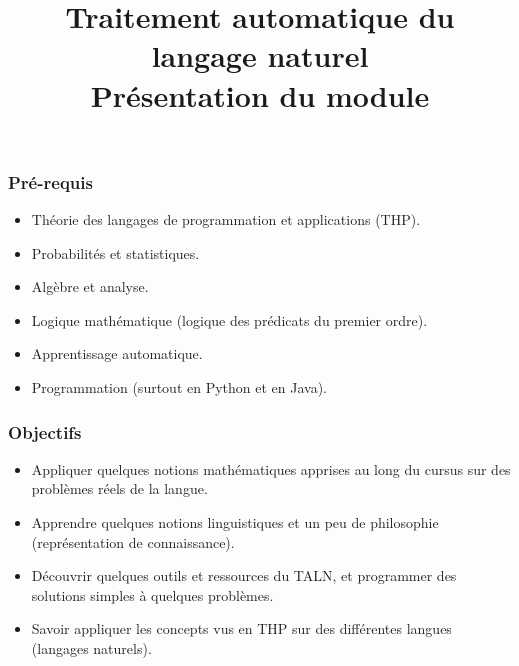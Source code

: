 \documentclass{beamer}
\title[TALN : Présentation] %
{Traitement automatique du langage naturel\\Présentation du module}
\begin{document}
\begin{frame}
\frametitle{Pré-requis}

\begin{itemize}
	\item Théorie des langages de programmation et applications (THP).
	\item Probabilités et statistiques.
	\item Algèbre et analyse.
	\item Logique mathématique (logique des prédicats du premier ordre).
	\item Apprentissage automatique.
	\item Programmation (surtout en Python et en Java).
\end{itemize}

\end{frame}


\begin{frame}
\frametitle{Objectifs}

\begin{itemize}
	\item Appliquer quelques notions mathématiques apprises au long du cursus sur des problèmes réels de la langue.
	\item Apprendre quelques notions linguistiques et un peu de philosophie (représentation de connaissance).
	\item Découvrir quelques outils et ressources du TALN, et programmer des solutions simples à quelques problèmes.
	\item Savoir appliquer les concepts vus en THP sur des différentes langues (langages naturels).
\end{itemize}

\end{frame}
\end{document}

